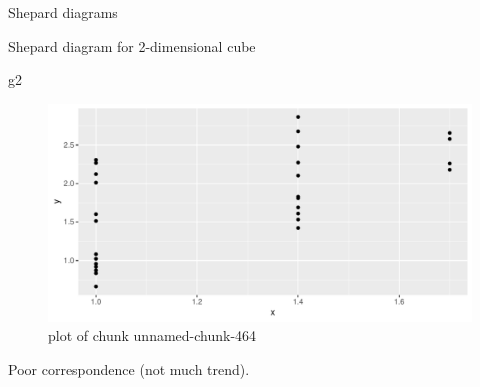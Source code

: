 \documentclass[ignorenonframetext,]{beamer}
\newenvironment{Shaded}{\begin{snugshade}}{\end{snugshade}}
\newcommand{\DataTypeTok}[1]{\textcolor[rgb]{0.13,0.29,0.53}{#1}}
\newcommand{\FloatTok}[1]{\textcolor[rgb]{0.00,0.00,0.81}{#1}}
\newcommand{\KeywordTok}[1]{\textcolor[rgb]{0.13,0.29,0.53}{\textbf{#1}}}
\newcommand{\NormalTok}[1]{#1}
\newcommand{\OperatorTok}[1]{\textcolor[rgb]{0.81,0.36,0.00}{\textbf{#1}}}
\newcommand{\StringTok}[1]{\textcolor[rgb]{0.31,0.60,0.02}{#1}}
\begin{document}
\begin{frame}[fragile]{Shepard diagrams}
\protect\hypertarget{shepard-diagrams}{}

\normalsize

\begin{Shaded}
\end{Shaded}

\normalsize

\end{frame}

\begin{frame}[fragile]{Shepard diagram for 2-dimensional cube}
\protect\hypertarget{shepard-diagram-for-2-dimensional-cube}{}

\begin{Shaded}
\begin{Highlighting}[]
\NormalTok{g2}
\end{Highlighting}
\end{Shaded}

\begin{figure}
\centering
\includegraphics{figure/unnamed-chunk-464-1.pdf}
\caption{plot of chunk unnamed-chunk-464}
\end{figure}

Poor correspondence (not much trend).

\end{frame}
\end{document}
